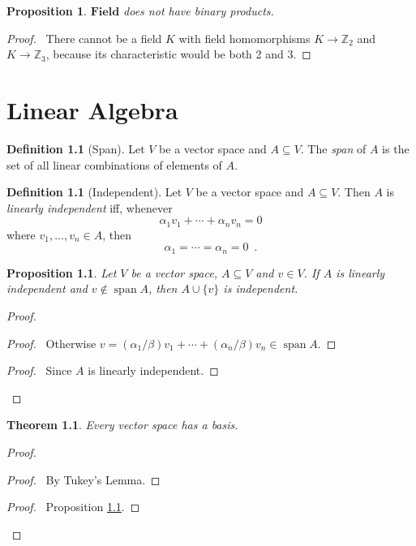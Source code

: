 \documentclass{book}
\let\qed\relax
\newtheorem{prop}[ax]{Proposition}
\newtheorem{thm}[ax]{Theorem}
\theoremstyle{definition}
\newtheorem{df}[ax]{Definition}
\newcommand{\spn}{\ensuremath{\operatorname{span}}}
\begin{document}
\begin{prop}
$\mathbf{Field}$ does not have binary products.
\end{prop}

\begin{proof}
\pf\ There cannot be a field $K$ with field homomorphisms $K \rightarrow \mathbb{Z}_2$ and $K \rightarrow \mathbb{Z}_3$, because its characteristic would be both 2 and 3. \qed
\end{proof}

\chapter{Linear Algebra}

\begin{df}[Span]
Let $V$ be a vector space and $A \subseteq V$. The \emph{span} of $A$ is the set of all linear combinations of elements of $A$.
\end{df}

\begin{df}[Independent]
Let $V$ be a vector space and $A \subseteq V$. Then $A$ is \emph{linearly independent} iff, whenever
\[ \alpha_1 v_1 + \cdots + \alpha_n v_n = 0 \]
where $v_1, \ldots, v_n \in A$, then
\[ \alpha_1 = \cdots = \alpha_n = 0 \enspace . \]
\end{df}

\begin{prop}
\label{prop:extend_linearly_independent}
Let $V$ be a vector space, $A \subseteq V$ and $v \in V$. If $A$ is linearly independent and $v \notin \spn A$, then $A \cup \{ v \}$ is independent.
\end{prop}

\begin{proof}
\pf
{}
\begin{proof}
	\pf\ Otherwise $v = (\alpha_1 / \beta) v_1 + \cdots + (\alpha_n / \beta) v_n \in \spn A$.
\end{proof}
\begin{proof}
	\pf\ Since $A$ is linearly independent.
\end{proof}
\qed
\end{proof}

\begin{thm}
Every vector space has a basis.
\end{thm}

\begin{proof}
\pf
{}
\begin{proof}
	\pf\ By Tukey's Lemma.
\end{proof}
\step{3}{$\spn \mathcal{B} = V$}
\begin{proof}
	\pf\ Proposition \ref{prop:extend_linearly_independent}.
\end{proof}
\qed
\end{proof}
\end{document}
